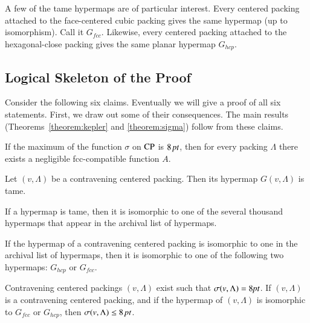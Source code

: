 A few of the tame hypermaps are of particular interest. Every
centered packing attached to the face-centered cubic packing gives
the same hypermap (up to isomorphism).  Call it $G_{fcc}$.
Likewise, every centered packing attached to the hexagonal-close
packing gives the same planar hypermap $G_{hcp}$.


\subsection{Logical Skeleton of the Proof}
\label{sec:logic}

Consider the following six claims.  Eventually we will give a
proof of all six statements.  First, we draw out some of their
consequences.  The main results (Theorems~\ref{theorem:kepler} and
\ref{theorem:sigma}) follow from these claims.

\begin{claim}\label{claim-A}
If the maximum of the function $\sigma$ on ${\operatorname{CP}}$ is $8\,\hbox{\it pt}$,
then for every %
packing $\Lambda$ there exists a
negligible fcc-compatible function $A$.
\end{claim}

\begin{claim}\label{claim-B}
Let $(v,\Lambda)$ be a contravening centered packing. Then its hypermap
$G(v,\Lambda)$ is tame.
\end{claim} %

\begin{claim}\label{claim-C}
If a hypermap is tame, then it is isomorphic to one of the several
thousand hypermaps that appear in the archival list of hypermaps.
\end{claim} %

\begin{claim}\label{claim-D}
If the hypermap of a contravening centered packing is isomorphic
to one in the archival list of hypermaps, then it is isomorphic to
one of the following two hypermaps:  $G_{hcp}$ or $G_{fcc}$.
\end{claim} %


\begin{claim}\label{claim-F}
Contravening centered packings $(v,\Lambda)$ exist such that
$\sigma(v,\Lambda)=8\hbox{\it pt}$. If $(v,\Lambda)$ is a contravening centered packing, and
if the hypermap of $(v,\Lambda)$ is isomorphic to $G_{fcc}$ or $G_{hcp}$,
then $\sigma(v,\Lambda) \le 8\,\hbox{\it pt}$.
\end{claim} %


